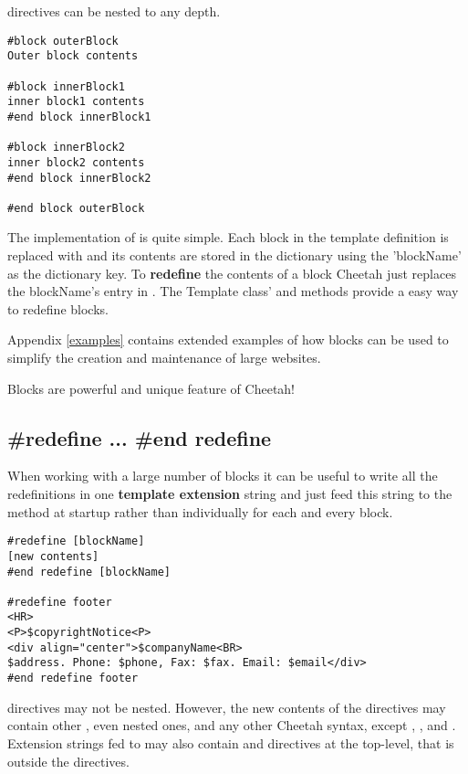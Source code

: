  directives can be nested to any depth.

\begin{verbatim}
#block outerBlock
Outer block contents 

#block innerBlock1
inner block1 contents 
#end block innerBlock1

#block innerBlock2
inner block2 contents 
#end block innerBlock2

#end block outerBlock
\end{verbatim}

The implementation of  is quite simple.  Each block in the
template definition is replaced with  and its contents are stored in the dictionary
 using the 'blockName' as the dictionary key.  To
{\bf redefine} the contents of a block Cheetah just replaces the blockName's
entry in .  The Template class'
 and 
methods provide a easy way to redefine blocks.

Appendix \ref{examples} contains extended examples of how blocks can be used to
simplify the creation and maintenance of large websites.

Blocks are powerful and unique feature of Cheetah!

\subsection{\#redefine ... \#end redefine}
\label{directives.redefine}

When working with a large number of blocks it can be useful to write all the
redefinitions in one {\bf template extension} string and just feed this string
to the  method at startup rather
than individually  for each and every block.

\begin{verbatim}
#redefine [blockName]
[new contents]
#end redefine [blockName]

#redefine footer
<HR>
<P>$copyrightNotice<P>
<div align="center">$companyName<BR>
$address. Phone: $phone, Fax: $fax. Email: $email</div>
#end redefine footer
\end{verbatim}

 directives may not be nested.  However, the new contents of
the  directives may contain other , even nested
ones, and any other Cheetah syntax, except , , and
. Extension strings fed to
 may also contain  and
 directives at the top-level, that is outside the
 directives.

